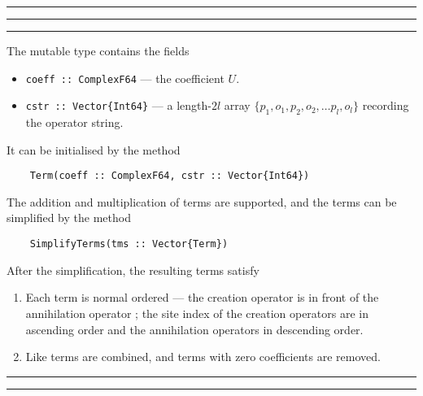 \documentclass{timesjhep}
\newenvironment{block}[1]{\vspace{0.4\baselineskip}\hrule\vspace{0.10\baselineskip}\hrule\vspace{0.30\baselineskip}{\bfseries #1}\vspace{0.2\baselineskip}\hrule\vspace{0.3\baselineskip}
}{\vspace{0.2\baselineskip}\hrule\vspace{0.10\baselineskip}\hrule\vspace{0.5\baselineskip}}
\begin{document}
\begin{block}{\lstinline|Term| --- Type}
The mutable type contains the fields
\begin{itemize}
    \item \lstinline|coeff :: ComplexF64| --- the coefficient $U$.
    \item \lstinline|cstr :: Vector{Int64}| --- a length-$2l$ array $\{p_1,o_1,p_2,o_2,… p_l,o_l\}$ recording the operator string.
\end{itemize}
It can be initialised by the method 
\begin{lstlisting}
    Term(coeff :: ComplexF64, cstr :: Vector{Int64})
\end{lstlisting}
The addition and multiplication of terms are supported, and the terms can be simplified by the method  
\begin{lstlisting}
    SimplifyTerms(tms :: Vector{Term})
\end{lstlisting}
After the simplification, the resulting terms satisfy 
\begin{enumerate}
    \item Each term is normal ordered --- the creation operator is in front of the annihilation operator ; the site index of the creation operators are in ascending order and the annihilation operators in descending order. 
    \item Like terms are combined, and terms with zero coefficients are removed.
\end{enumerate}
\end{block}
\end{document}
